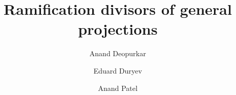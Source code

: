 \documentclass[11pt,reqno]{amsart}
\title[Projection and ramification]{Ramification divisors of general projections}
\author[Deopurkar]{Anand Deopurkar}
\author[Duryev]{Eduard Duryev}
\author[Patel]{Anand Patel}
\numberwithin{equation}{section}
\begin{document}
\begin{abstract}

\end{abstract}

\maketitle

   
\end{document}

